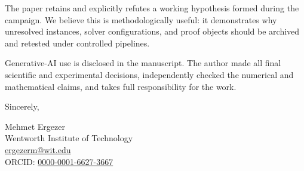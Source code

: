 \documentclass[10pt]{article}
\begin{document}
The paper retains and explicitly refutes a working hypothesis formed during
the campaign. We believe this is methodologically useful: it demonstrates why
unresolved instances, solver configurations, and proof objects should be
archived and retested under controlled pipelines.

Generative-AI use is disclosed in the manuscript. The author made all final
scientific and experimental decisions, independently checked the numerical
and mathematical claims, and takes full responsibility for the work.

Sincerely,

\vspace{0.8em}
Mehmet Ergezer\\
Wentworth Institute of Technology\\
\href{mailto:ergezerm@wit.edu}{ergezerm@wit.edu}\\
ORCID: \href{https://orcid.org/0000-0001-6627-3667}{0000-0001-6627-3667}
\end{document}
